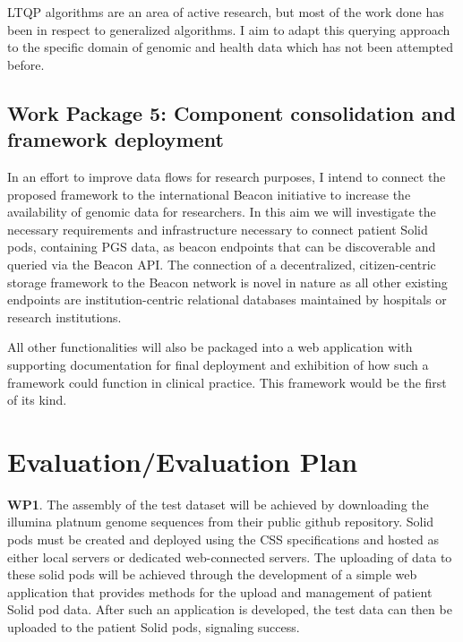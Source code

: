 \documentclass[runningheads]{llncs}
\begin{document}
LTQP algorithms are an area of active research, but most of the work done has been in respect to generalized algorithms.
I aim to adapt this querying approach to the specific domain of genomic and health data which has not been attempted before. 

\subsection{Work Package 5: Component consolidation and framework deployment}

In an effort to improve data flows for research purposes, I intend to connect the proposed framework to the international Beacon initiative \cite{rambla_beacon_2022} to increase the availability of genomic data for researchers. 
In this aim we will investigate the necessary requirements and infrastructure necessary to connect patient Solid pods, containing PGS data, as beacon endpoints that can be discoverable and queried via the Beacon API. 
The connection of a decentralized, citizen-centric storage framework to the Beacon network is novel in nature as all other existing endpoints are institution-centric relational databases maintained by hospitals or research institutions.

All other functionalities will also be packaged into a web application with supporting documentation for final deployment and exhibition of how such a framework could function in clinical practice.
This framework would be the first of its kind.


\section{Evaluation/Evaluation Plan}

\textbf{WP1}.
The assembly of the test dataset will be achieved by downloading the illumina platnum genome sequences from their public github repository.
Solid pods must be created and deployed using the CSS specifications and hosted as either local servers or dedicated web-connected servers.
The uploading of data to these solid pods will be achieved through the development of a simple web application that provides methods for the upload and management of patient Solid pod data. 
After such an application is developed, the test data can then be uploaded to the patient Solid pods, signaling success.
\end{document}
